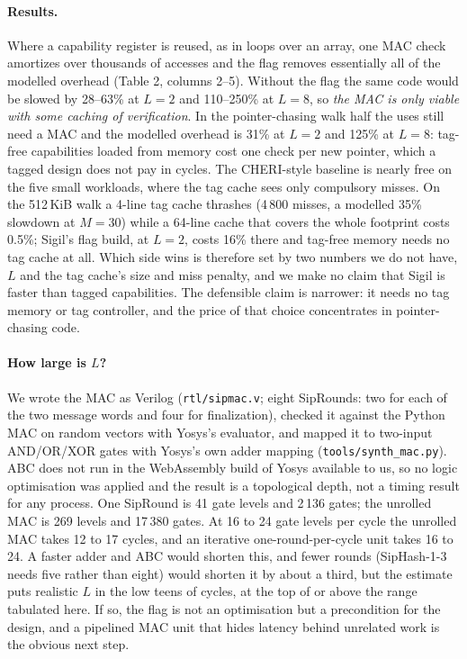\documentclass[10pt,a4paper]{article}
\begin{document}
\paragraph{Results.} Where a capability register is reused, as in loops over an array, one MAC check amortizes over thousands of accesses and the flag removes essentially all of the modelled overhead (Table 2, columns 2--5). Without the flag the same code would be slowed by 28--63\% at $L=2$ and 110--250\% at $L=8$, so \emph{the MAC is only viable with some caching of verification}. In the pointer-chasing walk half the uses still need a MAC and the modelled overhead is 31\% at $L=2$ and 125\% at $L=8$: tag-free capabilities loaded from memory cost one check per new pointer, which a tagged design does not pay in cycles. The CHERI-style baseline is nearly free on the five small workloads, where the tag cache sees only compulsory misses. On the 512\,KiB walk a 4-line tag cache thrashes (4\,800 misses, a modelled 35\% slowdown at $M=30$) while a 64-line cache that covers the whole footprint costs 0.5\%; Sigil's flag build, at $L=2$, costs 16\% there and tag-free memory needs no tag cache at all. Which side wins is therefore set by two numbers we do not have, $L$ and the tag cache's size and miss penalty, and we make no claim that Sigil is faster than tagged capabilities. The defensible claim is narrower: it needs no tag memory or tag controller, and the price of that choice concentrates in pointer-chasing code.
\paragraph{How large is $L$?} We wrote the MAC as Verilog (\texttt{rtl/sipmac.v}; eight SipRounds: two for each of the two message words and four for finalization), checked it against the Python MAC on random vectors with Yosys's evaluator, and mapped it to two-input AND/OR/XOR gates with Yosys's own adder mapping (\texttt{tools/synth\_mac.py}). ABC does not run in the WebAssembly build of Yosys available to us, so no logic optimisation was applied and the result is a topological depth, not a timing result for any process. One SipRound is 41 gate levels and 2\,136 gates; the unrolled MAC is 269 levels and 17\,380 gates. At 16 to 24 gate levels per cycle the unrolled MAC takes 12 to 17 cycles, and an iterative one-round-per-cycle unit takes 16 to 24. A faster adder and ABC would shorten this, and fewer rounds (SipHash-1-3 needs five rather than eight) would shorten it by about a third, but the estimate puts realistic $L$ in the low teens of cycles, at the top of or above the range tabulated here. If so, the flag is not an optimisation but a precondition for the design, and a pipelined MAC unit that hides latency behind unrelated work is the obvious next step.
\end{document}
